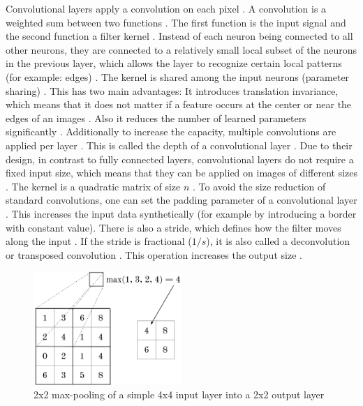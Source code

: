 \documentclass[draft,final,oneside]{vutinfth} %
\begin{document}
Convolutional layers apply a convolution on each pixel \cite{bishop}. A convolution is a weighted sum between two functions \cite{Goodfellow-et-al-2016}. The first function is the input signal and the second function a filter kernel \cite{bishop}. Instead of each neuron being connected to all other neurons, they are connected to a relatively small local subset of the neurons in the previous layer, which allows the layer to recognize certain local patterns (for example: edges) \cite{Goodfellow-et-al-2016}. The kernel is shared among the input neurons (parameter sharing) \cite{bishop}. This has two main advantages: It introduces translation invariance, which means that it does not matter if a feature occurs at the center or near the edges of an images \cite{Goodfellow-et-al-2016}. Also it reduces the number of learned parameters significantly \cite{bishop}. Additionally to increase the capacity, multiple convolutions are applied per layer \cite{Goodfellow-et-al-2016}. This is called the depth of a convolutional layer \cite{Goodfellow-et-al-2016}. Due to their design, in contrast to fully connected layers, convolutional layers do not require a fixed input size, which means that they can be applied on images of different sizes \cite{dlvc}. The kernel is a quadratic matrix of size $n$ \cite{alexnet}. To avoid the size reduction of standard convolutions, one can set the padding parameter of a convolutional layer \cite{Goodfellow-et-al-2016}. This increases the input data synthetically (for example by introducing a border with constant value). There is also a stride, which defines how the filter moves along the input \cite{Goodfellow-et-al-2016}. If the stride is fractional ($1/s$), it is also called a deconvolution or transposed convolution \cite{dlvc}. This operation increases the output size \cite{Goodfellow-et-al-2016}.


\begin{figure}[ht]
	\centering
  	\includegraphics[width=0.5\textwidth]{graphics/maxpooling.png}
	\caption{2x2 max-pooling of a simple 4x4 input layer into a 2x2 output layer}
	\label{fig:maxpooling}
\end{figure}
\end{document}
